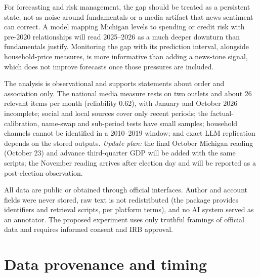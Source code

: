 \documentclass[11pt]{article}
\begin{document}
 For forecasting and risk management, the gap should be treated as a persistent state, not as noise around fundamentals or a media artifact that news sentiment can correct. A model mapping Michigan levels to spending or credit risk with pre-2020 relationships \citep{carroll1994} will read 2025–2026 as a much deeper downturn than fundamentals justify. Monitoring the gap with its prediction interval, alongside household-price measures, is more informative than adding a news-tone signal, which does not improve forecasts once those pressures are included.

 The analysis is observational and supports statements about order and association only. The national media measure rests on two outlets and about 26 relevant items per month (reliability 0.62), with January and October 2026 incomplete; social and local sources cover only recent periods; the factual-calibration, name-swap and sub-period tests have small samples; household channels cannot be identified in a 2010–2019 window; and exact LLM replication depends on the stored outputs. \textit{Update plan:} the final October Michigan reading (October 23) and advance third-quarter GDP will be added with the same scripts; the November reading arrives after election day and will be reported as a post-election observation.

 All data are public or obtained through official interfaces. Author and account fields were never stored, raw text is not redistributed (the package provides identifiers and retrieval scripts, per platform terms), and no AI system served as an annotator. The proposed experiment uses only truthful framings of official data and requires informed consent and IRB approval.




\clearpage
\appendix
{}
\renewcommand{\thesection}{\Alph{section}}
\renewcommand{\thetable}{\thesection\arabic{table}}\renewcommand{\thefigure}{\thesection\arabic{figure}}
\section{Data provenance and timing}\label{app:data}
\end{document}
